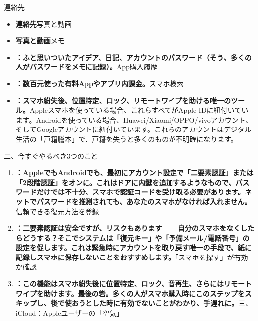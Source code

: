 


連絡先

\begin{itemize}
  \item \textbf{連絡先}写真と動画
  \item \textbf{写真と動画}メモ
  \item \textbf{：ふと思いついたアイデア、日記、アカウントのパスワード（そう、多くの人がパスワードをメモに記録）。}App購入履歴
  \item \textbf{：数百元使った有料Appやアプリ内課金。}スマホ検索
  \item \textbf{：スマホ紛失後、位置特定、ロック、リモートワイプを助ける唯一のツール。}Appleスマホを使っている場合、これらすべてがApple IDに紐付いています。Androidを使っている場合、Huawei/Xiaomi/OPPO/vivoアカウント、そしてGoogleアカウントに紐付いています。これらのアカウントはデジタル生活の「戸籍謄本」で、戸籍を失うと多くのものが不明確になります。
\end{itemize}

二、今すぐやるべき3つのこと


\begin{enumerate}
  \item \textbf{：AppleでもAndroidでも、最初にアカウント設定で「二要素認証」または「2段階認証」をオンに。これはドアに内鍵を追加するようなもので、パスワードだけでは不十分、スマホで認証コードを受け取る必要があります。ネットでパスワードを推測されても、あなたのスマホがなければ入れません。}信頼できる復元方法を登録
  \item \textbf{：二要素認証は安全ですが、リスクもあります——自分のスマホをなくしたらどうする？そこでシステムは「復元キー」や「予備メール/電話番号」の設定を促します。これは緊急時にアカウントを取り戻す唯一の手段で、紙に記録しスマホに保存しないことをおすすめします。}「スマホを探す」が有効か確認
  \item \textbf{：この機能はスマホ紛失後に位置特定、ロック、音再生、さらにはリモートワイプを助けます。最後の砦。多くの人がスマホ購入時にこのステップをスキップし、後で使おうとした時に有効でないことがわかり、手遅れに。}三、iCloud：Appleユーザーの「空気」
\end{enumerate}

